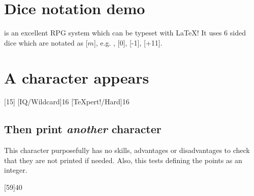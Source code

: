\documentclass{article}
\begin{document}
\tableofcontents

\section{Dice notation demo}
\label{sec:dice-notation-demo}

\gurps is an excellent RPG system which can be typeset with \LaTeX{}! It uses 6
sided dice which are notated as [$m$], e.g. , [0], [-1], [+11].

\section{A character appears}
\label{sec:character-appears}

\begin{character}
  [15]
  [IQ/Wildcard]{16}
  [\TeX pert!/Hard]{16}

\end{character}

\subsection{Then print \emph{another} character }
\label{sec:then-print-emph}

This character purposefully has no skills, advantages or disadvantages to check
that they are not printed if needed. Also, this tests defining the points as an
integer.

\begin{character}
  [59]{40}
\end{character}
\end{document}
